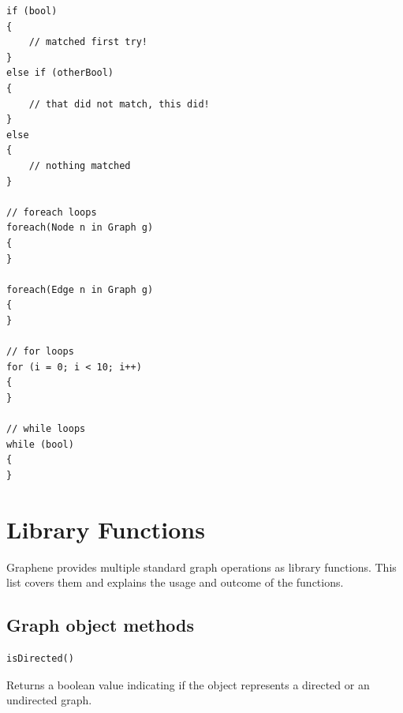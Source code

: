 \documentclass[a4paper]{article}
\begin{document}
\begin{verbatim}
if (bool)
{ 
    // matched first try!
}
else if (otherBool) 
{ 
    // that did not match, this did!
}
else 
{
    // nothing matched 
}

// foreach loops 
foreach(Node n in Graph g)
{	
}

foreach(Edge n in Graph g)
{
}

// for loops 
for (i = 0; i < 10; i++)
{
}

// while loops 
while (bool)
{
}
\end{verbatim}

\section{Library Functions}
\label{sec:examples}

Graphene provides multiple standard graph operations as library functions. This list covers them and explains the usage and outcome of the functions.

\subsection{Graph object methods}

\begin{verbatim}isDirected()\end{verbatim} Returns a boolean value indicating if the object represents a directed or an undirected graph.
\newline
\end{document}
